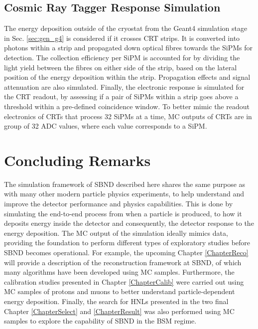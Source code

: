 \subsection{Cosmic Ray Tagger Response Simulation}
\label{sec:crt_response}

The energy deposition outside of the cryostat from the Geant4 simulation stage in Sec. \ref{sec:gen_g4} is considered if it crosses CRT strips.
It is converted into photons within a strip and propagated down optical fibres towards the SiPMs for detection.
The collection efficiency per SiPM is accounted for by dividing the light yield between the fibres on either side of the strip, based on the lateral position of the energy deposition within the strip.
Propagation effects and signal attenuation are also simulated.
Finally, the electronic response is simulated for the CRT readout, by assessing if a pair of SiPMs within a strip goes above a threshold within a pre-defined coincidence window.
To better mimic the readout electronics of CRTs that process 32 SiPMs at a time, MC outputs of CRTs are in group of 32 ADC values, where each value corresponds to a SiPM.

\section{Concluding Remarks}
\label{sec:sim_concluding_remarks}

The simulation framework of SBND described here shares the same purpose as with many other modern particle physics experiments, to help understand and improve the detector performance and physics capabilities.
This is done by simulating the end-to-end process from when a particle is produced, to how it deposits energy inside the detector and consequently, the detector response to the energy deposition.
The MC output of the simulation ideally mimics data, providing the foundation to perform different types of exploratory studies before SBND becomes operational.
For example, the upcoming Chapter \ref{ChapterReco} will provide a description of the reconstruction framework at SBND, of which many algorithms have been developed using MC samples.
Furthermore, the calibration studies presented in Chapter \ref{ChapterCalib} were carried out using MC samples of protons and muons to better understand particle-dependent energy deposition.
Finally, the search for HNLs presented in the two final Chapter \ref{ChapterSelect} and \ref{ChapterResult} was also performed using MC samples to explore the capability of SBND in the BSM regime.
